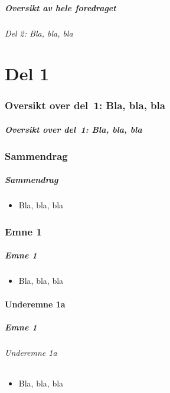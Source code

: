\begin{frame}%
  \frametitle{Oversikt av hele foredraget}
  \framesubtitle{Del 2: Bla, bla, bla}
  \tableofcontents[part=2]%
\end{frame}

\part{Del 1}

\begin{frame}
  \partpage
\end{frame}

\section*{Oversikt over del~1: Bla, bla, bla}
\begin{frame}%
  \frametitle{Oversikt over del~1: Bla, bla, bla}
    \tableofcontents%
\end{frame}

\section{Sammendrag}
\begin{frame}%
  \frametitle{Sammendrag}
  \pause
  \begin{itemize}[<+->]
  \item Bla, bla, bla
  \end{itemize}
\end{frame}

\section{Emne 1}
\begin{frame}%
  \frametitle{Emne 1}
  \pause
  \begin{itemize}[<+->]
  \item Bla, bla, bla
  \end{itemize}
\end{frame}

\subsection{Underemne 1a}
\begin{frame}%
  \frametitle{Emne 1}
  \framesubtitle{Underemne 1a}
  \pause
  \begin{itemize}[<+->]
  \item Bla, bla, bla
  \end{itemize}
\end{frame}

